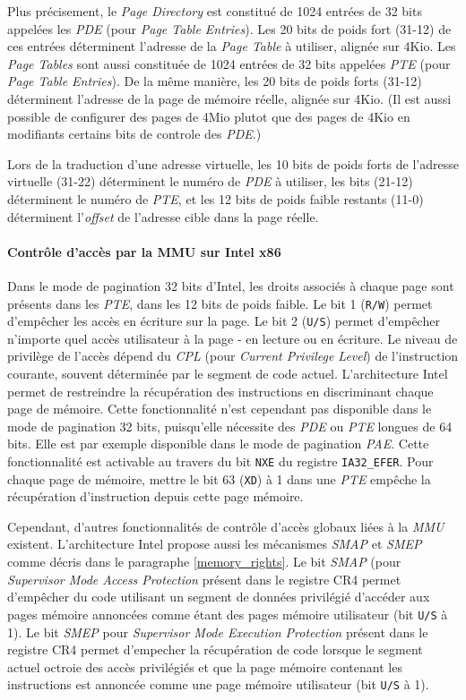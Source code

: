 Plus précisement, le \emph{Page Directory} est constitué de 1024 entrées de 32 bits appelées les \emph{PDE} (pour \emph{Page Table Entries}). Les 20 bits de poids fort (31-12) de ces entrées déterminent l'adresse de la \emph{Page Table} à utiliser, alignée sur 4Kio. Les \emph{Page Tables} sont aussi constituée de 1024 entrées de 32 bits appelées \emph{PTE} (pour \emph{Page Table Entries}). De la même manière, les 20 bits de poids forts (31-12) déterminent l'adresse de la page de mémoire réelle, alignée sur 4Kio. (Il est aussi possible de configurer des pages de 4Mio plutot que des pages de 4Kio en modifiants certains bits de controle des \emph{PDE}.)

Lors de la traduction d'une adresse virtuelle, les 10 bits de poids forts de l'adresse virtuelle (31-22) déterminent le numéro de \emph{PDE} à utiliser, les bits (21-12) déterminent le numéro de \emph{PTE}, et les 12 bits de poids faible restants (11-0) déterminent l'\emph{offset} de l'adresse cible dans la page réelle.~\cite{intel_32bits_paging}

\paragraph{Contrôle d'accès par la MMU sur Intel x86}
Dans le mode de pagination 32 bits d'Intel, les droits associés à chaque page sont présents dans les \emph{PTE}, dans les 12 bits de poids faible. Le bit 1 (\texttt{R/W}) permet d'empêcher les accès en écriture sur la page. Le bit 2 (\texttt{U/S}) permet d'empêcher n'importe quel accès utilisateur à la page - en lecture ou en écriture. Le niveau de privilège de l'accès dépend du \emph{CPL} (pour \emph{Current Privilege Level}) de l'instruction courante, souvent déterminée par le segment de code actuel.
L'architecture Intel permet de restreindre la récupération des instructions en discriminant chaque page de mémoire. Cette fonctionnalité n'est cependant pas disponible dans le mode de pagination 32 bits, puisqu'elle nécessite des \emph{PDE} ou \emph{PTE} longues de 64 bits. Elle est par exemple disponible dans le mode de pagination \emph{PAE}. Cette fonctionnalité est activable au travers du bit \texttt{NXE} du registre \texttt{IA32\_EFER}. Pour chaque page de mémoire, mettre le bit 63 (\texttt{XD}) à 1 dans une \emph{PTE} empêche la récupération d'instruction depuis cette page mémoire.

Cependant, d'autres fonctionnalités de contrôle d'accès globaux liées à la \emph{MMU} existent. L'architecture Intel propose aussi les mécanismes \emph{SMAP} et \emph{SMEP} comme décris dans le paragraphe \ref{memory_rights}.
Le bit \emph{SMAP} (pour \emph{Supervisor Mode Access Protection} présent dans le registre CR4 permet d'empêcher du code utilisant un segment de données privilégié d'accéder aux pages mémoire annoncées comme étant des pages mémoire utilisateur (bit \texttt{U/S} à 1).
Le bit \emph{SMEP} pour \emph{Supervisor Mode Execution Protection} présent dans le registre CR4 permet d'empecher la récupération de code lorsque le segment actuel octroie des accès privilégiés et que la page mémoire contenant les instructions est annoncée comme une page mémoire utilisateur (bit \texttt{U/S} à 1).

